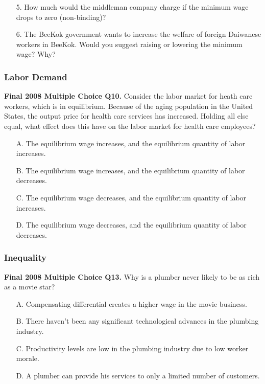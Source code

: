 \documentclass[12pt, xcolor=dvipsnames]{beamer}
\begin{document}
\begin{frame}
\small 
\begin{enumerate}\itemsep-0.5ex 
\item[5.] How much would the middleman company charge if the minimum wage drops to
zero (non-binding)?
\item[6.] The BeeKok government wants to increase the welfare of foreign Daiwanese
workers in BeeKok. Would you suggest raising or lowering the minimum wage? Why?
\end{enumerate}
\end{frame}



\begin{frame}
\frametitle{\bf Labor Demand}
\small \textsf{\bfseries Final 2008 Multiple Choice Q10.} 
Consider the labor market for heath care workers, which is in equilibrium. Because of the
aging population in the United States, the output price for health care services has increased.
Holding all else equal, what effect does this have on the labor market for health care
employees?\begin{enumerate}\itemsep-0.5ex 
\item[A.] The equilibrium wage increases, and the equilibrium quantity of labor increases.
\item[B.] The equilibrium wage increases, and the equilibrium quantity of labor decreases.
\item[C.] The equilibrium wage decreases, and the equilibrium quantity of labor increases.
\item[D.] The equilibrium wage decreases, and the equilibrium quantity of labor decreases. 
\end{enumerate}
\end{frame}


\begin{frame}
\frametitle{\bf Inequality}
\small \textsf{\bfseries Final 2008 Multiple Choice Q13.} 
Why is a plumber never likely to be as rich as a movie star?
\begin{enumerate}\itemsep-0.5ex 
\item[A.] Compensating differential creates a higher wage in the movie business.
\item[B.] There haven't been any significant technological advances in the plumbing industry.
\item[C.] Productivity levels are low in the plumbing industry due to low worker morale.
\item[D.] A plumber can provide his services to only a limited number of customers. 
\end{enumerate}
\end{frame}
\end{document}

